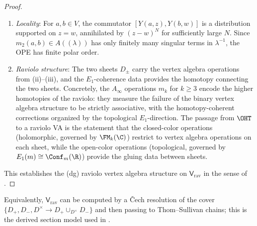 \begin{proof}
\begin{enumerate}[label=(\roman*)]
\item \emph{Locality}: For $a,b\in V$, the commutator $[Y(a,z), Y(b,w)]$ is a distribution supported on $z=w$, annihilated by $(z-w)^N$ for sufficiently large $N$. Since $m_2(a,b)\in A((\lambda))$ has only finitely many singular terms in $\lambda^{-1}$, the OPE has finite polar order.

\item \emph{Raviolo structure}: The two sheets $D_\pm$ carry the vertex algebra operations from (ii)--(iii), and the $E_1$-coherence data provides the homotopy connecting the two sheets. Concretely, the $A_\infty$ operations $m_k$ for $k\ge 3$ encode the higher homotopies of the raviolo: they measure the failure of the binary vertex algebra structure to be strictly associative, with the homotopy-coherent corrections organized by the topological $E_1$-direction. The passage from $\OHT$ to a raviolo VA is the statement that the closed-color operations (holomorphic, governed by $\FM_k(\C)$) restrict to vertex algebra operations on each sheet, while the open-color operations (topological, governed by $E_1(m)\cong\Conf_m(\R)$) provide the gluing data between sheets.
\end{enumerate}
This establishes the (dg) raviolo vertex algebra structure on $\mathsf{V}_{\mathrm{rav}}$ in the sense of \cite{GW23, AKY24}.
\end{proof}

\begin{remark}
\label{rmk:TS-model}
Equivalently, $\mathsf V_{\mathrm{rav}}$ can be computed by a Čech resolution of
the cover $\{D_+,D_-,D^\times\to D_+\cup_{D^\times}D_-\}$ and then passing to
Thom–Sullivan chains; this is the derived section model used in
\cite{GW23,AKY24}.
\end{remark}


